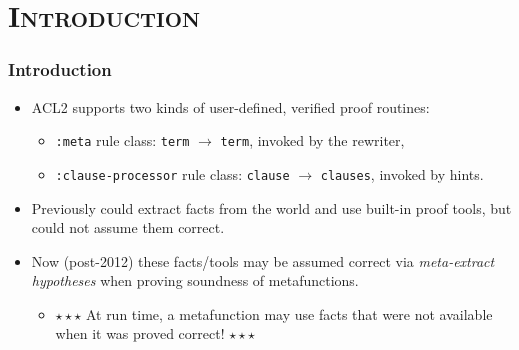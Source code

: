\section{\scshape Introduction}
\begin{frame}[fragile]
\frametitle{Introduction}

\begin{itemize}

\item ACL2 supports two kinds of user-defined, verified proof routines:
\begin{itemize}
\item \texttt{:meta} rule class: \texttt{term} $\rightarrow$ \texttt{term}, invoked by the rewriter, 
\item \texttt{:clause-processor} rule class: \texttt{clause} $\rightarrow$ \texttt{clauses}, invoked by hints.
\end{itemize}
\item Previously could extract facts from the world and use built-in proof tools, but could not assume them correct.
\item Now (post-2012) these facts/tools may be assumed correct via \textit{meta-extract hypotheses} when proving soundness of metafunctions.

  \begin{itemize}
  \item $\star\star\star$ At run time, a metafunction may use facts that were not available when it was proved correct! $\star\star\star$
  \end{itemize}
\end{itemize}
\end{frame}

